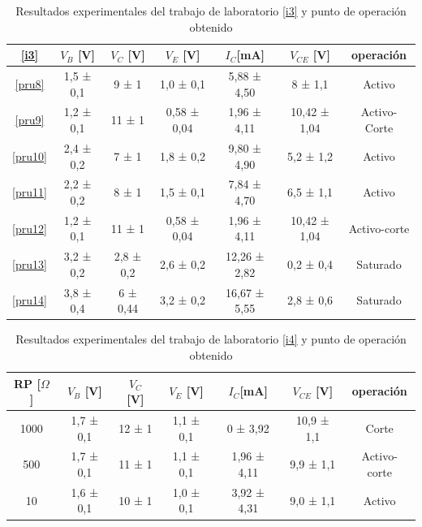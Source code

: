 \documentclass[10pt, a4paper]{article}
\begin{document}
    \begin{table}[h!]
        \centering
        \caption{Resultados experimentales del trabajo de laboratorio \ref{i3} y punto de operación obtenido}
        \label{tab:3}
        \begin{tabular}{|c|c|c|c|c|c|c|} \hline
            \ref{i3} &  $V_B$ [V]       &    $V_C$ [V]&  $V_E$ [V]      &      $I_C$[mA]        &    $V_{CE}$ [V] & operación  \\ \hline
            \ref{pru8}   &  1,5 ± 0,1    &9 ± 1&  1,0 ± 0,1 &5,88 ± 4,50&   8 ± 1,1 & Activo \\
            \ref{pru9}    &1,2 ± 0,1    & 11 ± 1&   0,58 ± 0,04&1,96 ± 4,11& 10,42 ± 1,04 & Activo-Corte  \\
            \ref{pru10}    &2,4 ± 0,2&   7 ± 1&  1,8 ± 0,2& 9,80 ± 4,90&5,2 ± 1,2  & Activo   \\
            \ref{pru11}    &  2,2 ± 0,2&8 ± 1&  1,5 ± 0,1   &7,84 ± 4,70&   6,5 ± 1,1 & Activo \\
            \ref{pru12}    &1,2 ± 0,1&11 ± 1&    0,58 ± 0,04&    1,96 ± 4,11&10,42 ± 1,04 & Activo-corte  \\
            \ref{pru13}    & 3,2 ± 0,2&2,8 ± 0,2& 2,6 ± 0,2&12,26 ± 2,82 &0,2 ± 0,4 & Saturado \\
            \ref{pru14}    &3,8 ± 0,4&6 ± 0,44 & 3,2 ± 0,2& 16,67 ± 5,55&   2,8 ± 0,6 & Saturado\\ \hline
        \end{tabular}
    \end{table}

    \begin{table}[h!]
        \centering
        \caption{Resultados experimentales del trabajo de laboratorio \ref{i4} y punto de operación obtenido}
        \label{tab:4}
        \begin{tabular}{|c|c|c|c|c|c|c|} \hline
            RP [$\Omega$]  &$V_B$ [V]&    $V_C$ [V]    &      $V_E$ [V]      &      $I_C$[mA]        &    $V_{CE}$ [V]  & operación       \\ \hline
            1000     &   1,7 ± 0,1   &    12 ± 1     &    1,1 ± 0,1     &     0 ± 3,92       &   10,9 ± 1,1 & Corte      \\
            500   &   1,7 ± 0,1   &    11 ± 1     &    1,1 ± 0,1     &  1,96 ± 4,11     &    9,9 ± 1,1  & Activo-corte      \\
            10   &   1,6 ± 0,1   &    10 ± 1     &    1,0 ± 0,1     &  3,92 ± 4,31     &    9,0 ± 1,1   & Activo    \\ \hline
        \end{tabular}
    \end{table}
\end{document}
